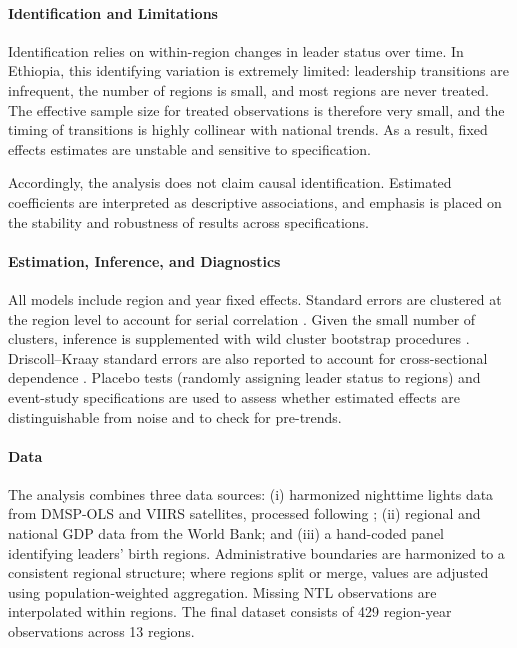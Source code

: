 \documentclass[12pt,a4paper]{article}
\begin{document}
\paragraph{Identification and Limitations}
Identification relies on within-region changes in leader status over time. In Ethiopia, this identifying variation is extremely limited: leadership transitions are infrequent, the number of regions is small, and most regions are never treated. The effective sample size for treated observations is therefore very small, and the timing of transitions is highly collinear with national trends. As a result, fixed effects estimates are unstable and sensitive to specification.

Accordingly, the analysis does not claim causal identification. Estimated coefficients are interpreted as descriptive associations, and emphasis is placed on the stability and robustness of results across specifications.

\paragraph{Estimation, Inference, and Diagnostics}
All models include region and year fixed effects. Standard errors are clustered at the region level to account for serial correlation \citep{Bertrand2004}. Given the small number of clusters, inference is supplemented with wild cluster bootstrap procedures \citep{CameronGelbachMiller2008}. Driscoll–Kraay standard errors are also reported to account for cross-sectional dependence \citep{DriscollKraay1998}. Placebo tests (randomly assigning leader status to regions) and event-study specifications are used to assess whether estimated effects are distinguishable from noise and to check for pre-trends.

\paragraph{Data}
The analysis combines three data sources: (i) harmonized nighttime lights data from DMSP-OLS and VIIRS satellites, processed following \citet{Li2023}; (ii) regional and national GDP data from the World Bank; and (iii) a hand-coded panel identifying leaders’ birth regions. Administrative boundaries are harmonized to a consistent regional structure; where regions split or merge, values are adjusted using population-weighted aggregation. Missing NTL observations are interpolated within regions. The final dataset consists of 429 region-year observations across 13 regions.
\end{document}
